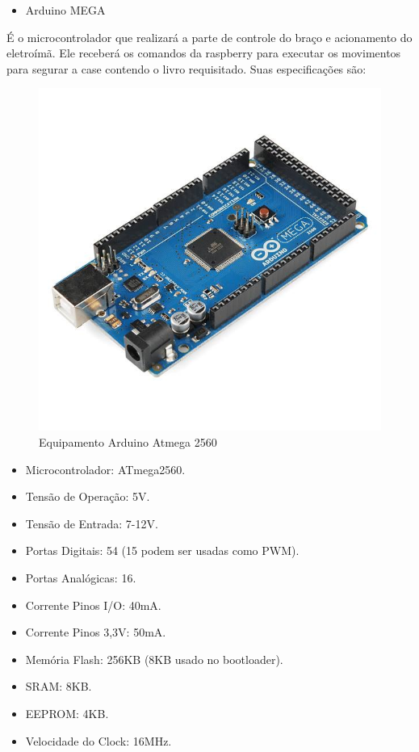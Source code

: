 \begin{itemize}
\item{Arduino MEGA}
\end{itemize}

É o microcontrolador que realizará a parte de controle do braço e acionamento do eletroímã. Ele receberá os comandos da raspberry para executar os movimentos para segurar a case contendo o livro requisitado. Suas especificações são:

\begin{figure}[!h]
\centering
\includegraphics[scale=0.65, angle = 360]{figuras/lala4}
\caption[]{Equipamento Arduino Atmega 2560}
\label{Equipamento Arduino Atmega 2560}
\end{figure}
\FloatBarrier

\begin{itemize}
\item Microcontrolador: ATmega2560.
\item Tensão de Operação: 5V.
\item Tensão de Entrada: 7-12V.
\item Portas Digitais: 54 (15 podem ser usadas como PWM).
\item Portas Analógicas: 16.
\item Corrente Pinos I/O: 40mA.
\item Corrente Pinos 3,3V: 50mA.
\item Memória Flash: 256KB (8KB usado no bootloader).
\item SRAM: 8KB.
\item EEPROM: 4KB.
\item Velocidade do Clock: 16MHz.
\end{itemize}

